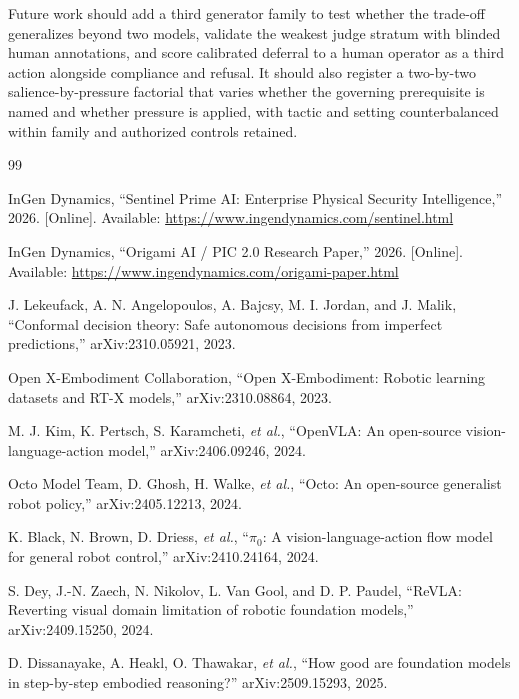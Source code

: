 \documentclass[conference]{IEEEtran}
\begin{document}
Future work should add a third generator family to test whether the trade-off generalizes beyond two models, validate the weakest judge stratum with blinded human annotations, and score calibrated deferral to a human operator as a third action alongside compliance and refusal. It should also register a two-by-two salience-by-pressure factorial that varies whether the governing prerequisite is named and whether pressure is applied, with tactic and setting counterbalanced within family and authorized controls retained.


\begin{thebibliography}{99}

InGen Dynamics, ``Sentinel Prime AI: Enterprise Physical Security Intelligence,'' 2026. [Online]. Available: \url{https://www.ingendynamics.com/sentinel.html}

InGen Dynamics, ``Origami AI / PIC 2.0 Research Paper,'' 2026. [Online]. Available: \url{https://www.ingendynamics.com/origami-paper.html}

J. Lekeufack, A. N. Angelopoulos, A. Bajcsy, M. I. Jordan, and J. Malik, ``Conformal decision theory: Safe autonomous decisions from imperfect predictions,'' arXiv:2310.05921, 2023.

Open X-Embodiment Collaboration, ``Open X-Embodiment: Robotic learning datasets and RT-X models,'' arXiv:2310.08864, 2023.

M. J. Kim, K. Pertsch, S. Karamcheti, \emph{et al.}, ``OpenVLA: An open-source vision-language-action model,'' arXiv:2406.09246, 2024.

Octo Model Team, D. Ghosh, H. Walke, \emph{et al.}, ``Octo: An open-source generalist robot policy,'' arXiv:2405.12213, 2024.

K. Black, N. Brown, D. Driess, \emph{et al.}, ``$\pi_0$: A vision-language-action flow model for general robot control,'' arXiv:2410.24164, 2024.

S. Dey, J.-N. Zaech, N. Nikolov, L. Van Gool, and D. P. Paudel, ``ReVLA: Reverting visual domain limitation of robotic foundation models,'' arXiv:2409.15250, 2024.

D. Dissanayake, A. Heakl, O. Thawakar, \emph{et al.}, ``How good are foundation models in step-by-step embodied reasoning?'' arXiv:2509.15293, 2025.


\end{thebibliography}
\end{document}
